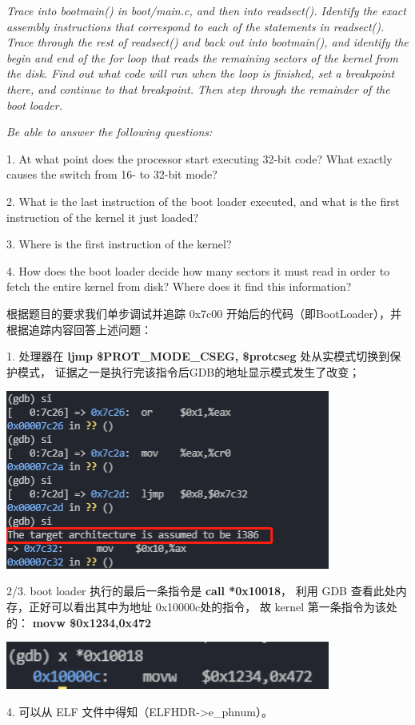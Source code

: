 \documentclass[12pt, letterpaper]{report}
\begin{document}
\textsl{
        Trace into bootmain() in boot/main.c, and then into readsect(). 
        Identify the exact assembly instructions that correspond to each of the statements in readsect(). 
        Trace through the rest of readsect() and back out into bootmain(), and identify the begin and end of the for loop 
        that reads the remaining sectors of the kernel from the disk. 
        Find out what code will run when the loop is finished, 
        set a breakpoint there, and continue to that breakpoint. 
        Then step through the remainder of the boot loader.
} \par
\quad \par
\textsl{
        Be able to answer the following questions:
} \par
{
        1. At what point does the processor start executing 32-bit code? 
        What exactly causes the switch from 16- to 32-bit mode?
} \par
{
        2. What is the last instruction of the boot loader executed, 
        and what is the first instruction of the kernel it just loaded?
} \par
{
        3. Where is the first instruction of the kernel?
} \par 
{
        4. How does the boot loader decide how many sectors 
        it must read in order to fetch the entire kernel from disk? 
        Where does it find this information?
} \par 
\quad \par
根据题目的要求我们单步调试并追踪 0x7c00 开始后的代码（即BootLoader），并根据追踪内容回答上述问题：\par 
{
        1. 处理器在 \textbf{ljmp    \$PROT\_MODE\_CSEG, \$protcseg} 处从实模式切换到保护模式，
        证据之一是执行完该指令后GDB的地址显示模式发生了改变；
} \par
\quad \par 
\includegraphics[width=0.8\textwidth]{real2protect}
\quad \par 
{
        2/3. boot loader 执行的最后一条指令是 \textbf{call *0x10018}，
        利用 GDB 查看此处内存，正好可以看出其中为地址 0x10000c处的指令，
        故 kernel 第一条指令为该处的： \textbf{movw   \$0x1234,0x472}
} \par
\quad \par  
\includegraphics[width=0.8\textwidth]{lastfirst}
\quad \par
{
        4. 可以从 ELF 文件中得知（ELFHDR->e\_phnum）。
} \par 
\end{document}
